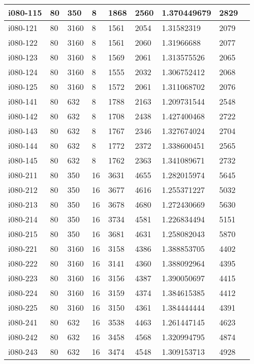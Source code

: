 \begin{appendices}
\begin{longtable}[htbp]{l l l l l l l l l}
 i080-115	&	80 	&	350 	&	8 	&	1868	&	2560	&	1.370449679	&	2829	\\
\hline
 i080-121	&	80 	&	3160 	&	8 	&	1561	&	2054	&	1.31582319	&	2079	\\
 i080-122	&	80 	&	3160 	&	8 	&	1561	&	2060	&	1.31966688	&	2077	\\
 i080-123	&	80 	&	3160 	&	8 	&	1569	&	2061	&	1.313575526	&	2065	\\
 i080-124	&	80 	&	3160 	&	8 	&	1555	&	2032	&	1.306752412	&	2068	\\
 i080-125	&	80 	&	3160 	&	8 	&	1572	&	2061	&	1.311068702	&	2076	\\
\hline
 i080-141	&	80 	&	632 	&	8 	&	1788	&	2163	&	1.209731544	&	2548	\\
 i080-142	&	80 	&	632 	&	8 	&	1708	&	2438	&	1.427400468	&	2722	\\
 i080-143	&	80 	&	632 	&	8 	&	1767	&	2346	&	1.327674024	&	2704	\\
 i080-144	&	80 	&	632 	&	8 	&	1772	&	2372	&	1.338600451	&	2565	\\
 i080-145	&	80 	&	632 	&	8 	&	1762	&	2363	&	1.341089671	&	2732	\\
\hline
 i080-211	&	80 	&	350 	&	16 	&	3631	&	4655	&	1.282015974	&	5645	\\
 i080-212	&	80 	&	350 	&	16 	&	3677	&	4616	&	1.255371227	&	5032	\\
 i080-213	&	80 	&	350 	&	16 	&	3678	&	4680	&	1.272430669	&	5630	\\
 i080-214	&	80 	&	350 	&	16 	&	3734	&	4581	&	1.226834494	&	5151	\\
 i080-215	&	80 	&	350 	&	16 	&	3681	&	4631	&	1.258082043	&	5870	\\
\hline
 i080-221	&	80 	&	3160 	&	16 	&	3158	&	4386	&	1.388853705	&	4402	\\
 i080-222	&	80 	&	3160 	&	16 	&	3141	&	4360	&	1.388092964	&	4395	\\
 i080-223	&	80 	&	3160 	&	16 	&	3156	&	4387	&	1.390050697	&	4415	\\
 i080-224	&	80 	&	3160 	&	16 	&	3159	&	4374	&	1.384615385	&	4412	\\
 i080-225	&	80 	&	3160 	&	16 	&	3150	&	4361	&	1.384444444	&	4391	\\
\hline
 i080-241	&	80 	&	632 	&	16 	&	3538	&	4463	&	1.261447145	&	4623	\\
 i080-242	&	80 	&	632 	&	16 	&	3458	&	4568	&	1.320994795	&	4874	\\
 i080-243	&	80 	&	632 	&	16 	&	3474	&	4548	&	1.309153713	&	4928	\\

\end{longtable}
\end{appendices}
